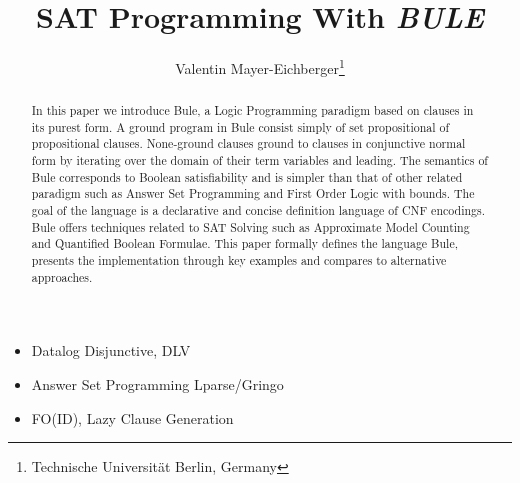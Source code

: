 \documentclass{new_tlp}
\title{ SAT Programming With \emph{BULE}}
\author{
    Valentin Mayer-Eichberger\footnote{Technische Universit\"at Berlin, Germany} 
}
\begin{document}
\maketitle


\begin{abstract}
    In this paper we introduce Bule, a Logic Programming paradigm based on clauses in its purest form. 
    A ground program in Bule consist simply of set propositional of propositional clauses. 
    None-ground clauses ground to clauses in conjunctive normal form by iterating over the domain of their term variables and leading. 
    The semantics of Bule corresponds to Boolean satisfiability and is simpler than that of other related paradigm such as Answer Set Programming and First Order Logic with bounds.  
    The goal of the language is a declarative and concise definition language of CNF encodings. 
    Bule offers techniques related to SAT Solving such as Approximate Model Counting and Quantified Boolean Formulae. 
    This paper formally defines the language Bule, presents the implementation through key examples and compares to alternative approaches. 




\end{abstract}

\begin{itemize}
    \item Datalog Disjunctive, DLV 
    \item Answer Set Programming Lparse/Gringo
    \item FO(ID), Lazy Clause Generation
\end{itemize}
\end{document}
